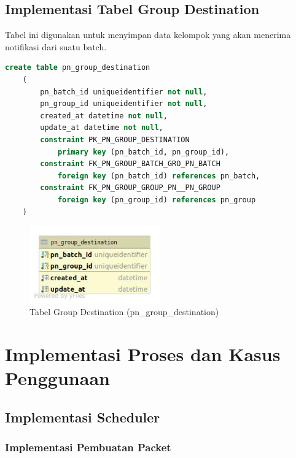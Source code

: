 \subsection{Implementasi Tabel Group Destination}
\par Tabel ini digunakan untuk menyimpan data kelompok yang akan menerima notifikasi dari suatu batch.
\begin{lstlisting}[language=sql, firstnumber=1, caption=Implementasi Tabel Group Destination]
    create table pn_group_destination
    (
        pn_batch_id uniqueidentifier not null,
        pn_group_id uniqueidentifier not null,
        created_at datetime not null,
        update_at datetime not null,
        constraint PK_PN_GROUP_DESTINATION
            primary key (pn_batch_id, pn_group_id),
        constraint FK_PN_GROUP_BATCH_GRO_PN_BATCH
            foreign key (pn_batch_id) references pn_batch,
        constraint FK_PN_GROUP_GROUP_PN__PN_GROUP
            foreign key (pn_group_id) references pn_group
    )
\end{lstlisting}
\begin{figure}[H]
    \centering\includegraphics[width=0.5\textwidth]{bab4/figures/tabel_pn_group_destination.jpg}
    \caption{Tabel Group Destination (pn\_group\_destination)}
    \label{tabel_pn_group_destination}
\end{figure}

\section{Implementasi Proses dan Kasus Penggunaan}

\subsection{Implementasi Scheduler}

\subsubsection{Implementasi Pembuatan Packet}

